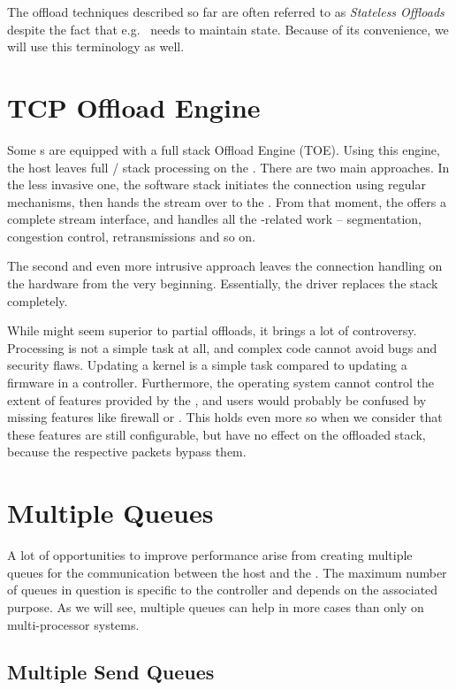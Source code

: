 The offload techniques described so far are often referred to as \emph{Stateless
Offloads} despite the fact that e.g.\  needs to maintain state. Because
of its convenience, we will use this terminology as well.

\section{TCP Offload Engine}

Some s are equipped with a full  stack Offload Engine (TOE). Using this
engine, the host leaves full / stack processing on the .
There are two main approaches. In the less invasive one, the software stack
initiates the connection using regular mechanisms, then hands the stream over
to the . From that moment, the  offers a complete stream
interface, and handles all the -related work -- segmentation, congestion
control, retransmissions and so on.

The second and even more intrusive approach leaves the  connection
handling on the hardware from the very beginning. Essentially, the  driver
replaces the  stack completely.

While  might seem superior to partial offloads, it brings a lot of
controversy. Processing  is not a simple task at all, and complex code
cannot avoid bugs and security flaws. Updating a kernel is a simple task
compared to updating a firmware in a controller. Furthermore, the operating
system cannot control the extent of features provided by the , and users
would probably be confused by missing features like firewall or . This holds even more so
when we consider that these features are still configurable, but have no effect
on the offloaded  stack, because the respective packets bypass them.

\section{Multiple Queues}

A lot of opportunities to improve performance arise from creating multiple
queues for the communication between the host and the . The maximum number
of queues in question is specific to the controller and depends on the
associated purpose. As we will see, multiple
queues can help in more cases than only on multi-processor systems.

\subsection{Multiple Send Queues}

